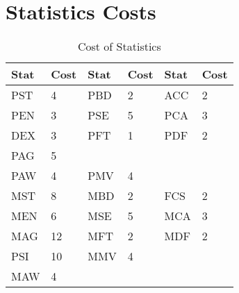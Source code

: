 \section{Statistics Costs}

\begin{table}[h]
	\begin{tabular}{llllll}
    Stat & Cost	&	Stat& Cost	& Stat	& Cost \\
\hline
	PST  & 4	&	PBD	&	2	&	ACC	&	2	\\
	PEN  & 3 	&	PSE	&	5	&	PCA	&	3	\\
	DEX  & 3	&	PFT	&	1	&	PDF	&	2	\\
	PAG  & 5	&		&		&		&		\\ 
	PAW	 & 4	&	PMV	&	4	&		&		\\
\hline	
	MST  & 8	&	MBD	&	2	&	FCS	&	2	\\
	MEN  & 6	&	MSE	&	5	&	MCA	&	3	\\
	MAG  & 12	&	MFT	&	2	&	MDF	&	2	\\
	PSI  & 10	&	MMV	&	4	&		&		\\ 
	MAW	 & 4	&		&		&		&		\\ 
	\end{tabular}
    \caption{Cost of Statistics}\label{Table:StatCosts}
\end{table}


